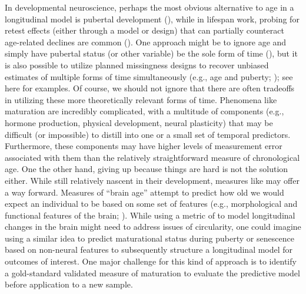 \documentclass[11pt]{article}
\begin{document}
In developmental neuroscience, perhaps the most obvious alternative to age in a longitudinal model is pubertal development (\cite{mccormick_multi-level_2021,wierenga_unraveling_2018}), while in lifespan work, probing for retest effects (either through a model or design) that can partially counteract age-related declines are common (\cite{ferrer_modeling_2004}). One approach might be to ignore age and simply have pubertal status (or other variable) be the sole form of time (\cite{wierenga_unraveling_2018}), but it is also possible to utilize planned missingness designs to recover unbiased estimates of multiple forms of time simultaneously (e.g., age and puberty; \cite{goddings_influence_2014,mccormick_multi-level_2021}); see here for examples. Of course, we should not ignore that there are often tradeoffs in utilizing these more theoretically relevant forms of time. Phenomena like maturation are incredibly complicated, with a multitude of components (e.g., hormone production, physical development, neural plasticity) that may be difficult (or impossible) to distill into one or a small set of temporal predictors. Furthermore, these components may have higher levels of measurement error associated with them than the relatively straightforward measure of chronological age. One the other hand, giving up because things are hard is not the solution either. While still relatively nascent in their development, measures like  may offer a way forward. Measures of “brain age” attempt to predict how old we would expect an individual to be based on some set of features (e.g., morphological and functional features of the brain; \cite{cole_predicting_2017}). While using a metric of  to model longitudinal changes in the brain might need to address issues of circularity, one could imagine using a similar idea to predict maturational status during puberty or senescence based on non-neural features to subsequently structure a longitudinal model for outcomes of interest. One major challenge for this kind of approach is to identify a gold-standard validated measure of maturation to evaluate the predictive model before application to a new sample. 
\end{document}
